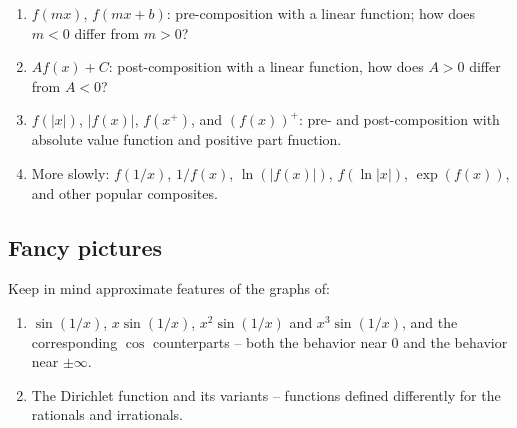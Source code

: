 \documentclass[10pt]{amsart}
\begin{document}
\begin{enumerate}
\item $f(mx)$, $f(mx + b)$: pre-composition with a linear function;
  how does $m < 0$ differ from $m > 0$?
\item $Af(x) + C$: post-composition with a linear function, how does
  $A > 0$ differ from $A < 0$?
\item $f(|x|)$, $|f(x)|$, $f(x^+)$, and $(f(x))^+$: pre- and
  post-composition with absolute value function and positive part
  fnuction.
\item More slowly: $f(1/x)$, $1/f(x)$, $\ln(|f(x)|)$, $f(\ln|x|)$,
  $\exp(f(x))$, and other popular composites.
\end{enumerate}

\subsection{Fancy pictures}

Keep in mind approximate features of the graphs of:

\begin{enumerate}
\item $\sin(1/x)$, $x\sin(1/x)$, $x^2 \sin(1/x)$ and $x^3\sin(1/x)$,
  and the corresponding $\cos$ counterparts -- both the behavior near
  $0$ and the behavior near $\pm \infty$.
\item The Dirichlet function and its variants -- functions defined
  differently for the rationals and irrationals.
\end{enumerate}
\end{document}
